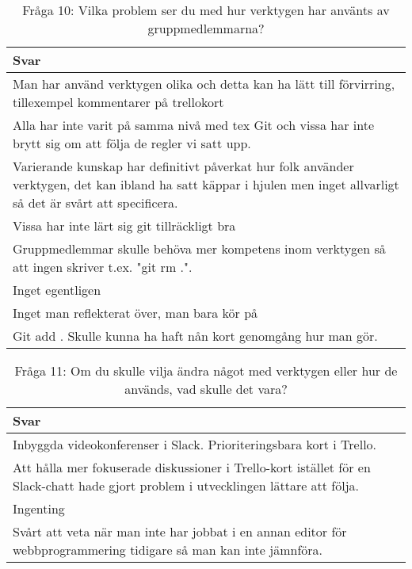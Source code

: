 \begin{table}[h!]
\centering
  \caption{Fråga 10: Vilka problem ser du med hur verktygen har använts av gruppmedlemmarna?}
  \def\arraystretch{1.5}
  \begin{adjustbox}{max width=\textwidth}
    \begin{tabularx}{\textwidth}{| X |}
      \hline
      \textbf{Svar} \\
      \hline
      Man har använd verktygen olika och detta kan ha lätt till förvirring, tillexempel kommentarer på trellokort \\
      \hline
      Alla har inte varit på samma nivå med tex Git och vissa har inte brytt sig om att följa de regler vi satt upp. \\
      \hline
      Varierande kunskap har definitivt påverkat hur folk använder verktygen, det kan ibland ha satt käppar i hjulen men inget allvarligt så det är svårt att specificera.\\
      \hline 
      Vissa har inte lärt sig git tillräckligt bra\\
      \hline 
      Gruppmedlemmar skulle behöva mer kompetens inom verktygen så att ingen skriver t.ex. "git rm .". \\
      \hline 
      Inget egentligen\\
      \hline 
      Inget man reflekterat över, man bara kör på\\
      \hline  
      Git add . Skulle kunna ha haft nån kort genomgång hur man gör.\\
      \hline
    \end{tabularx}
  \end{adjustbox}
\end{table}

\begin{table}[h!]
\centering
  \caption{Fråga 11: Om du skulle vilja ändra något med verktygen eller hur de används, vad skulle det vara?}
  \def\arraystretch{1.5}
  \begin{adjustbox}{max width=\textwidth}
    \begin{tabularx}{\textwidth}{| X |}
      \hline
      \textbf{Svar} \\
      \hline
      Inbyggda videokonferenser i Slack. Prioriteringsbara kort i Trello. \\
      \hline
      Att hålla mer fokuserade diskussioner i Trello-kort istället för en Slack-chatt hade gjort problem i utvecklingen lättare att följa. \\
      \hline
      Ingenting\\
      \hline 
      Svårt att veta när man inte har jobbat i en annan editor för webbprogrammering tidigare så man kan inte jämnföra.\\
      \hline 
    \end{tabularx}
  \end{adjustbox}
\end{table}

